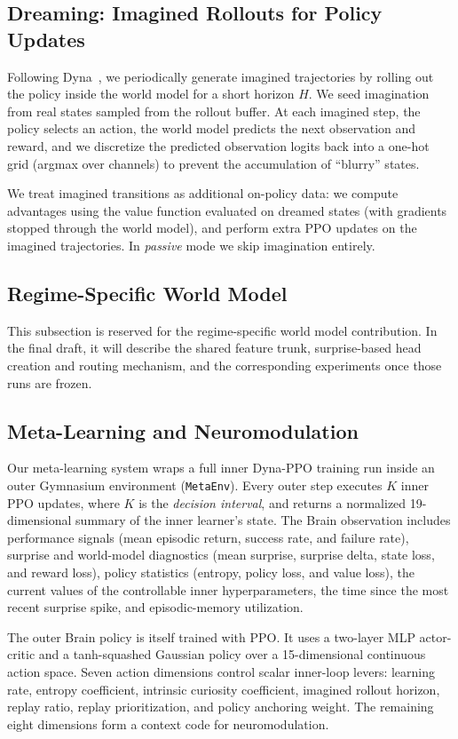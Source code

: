 ﻿\documentclass[sigconf]{acmart}
\begin{document}
\subsection{Dreaming: Imagined Rollouts for Policy Updates}
Following Dyna~\cite{sutton1990dyna}, we periodically generate imagined trajectories by rolling out the policy inside the world model for a short horizon $H$. We seed imagination from real states sampled from the rollout buffer. At each imagined step, the policy selects an action, the world model predicts the next observation and reward, and we discretize the predicted observation logits back into a one-hot grid (argmax over channels) to prevent the accumulation of ``blurry'' states.

We treat imagined transitions as additional on-policy data: we compute advantages using the value function evaluated on dreamed states (with gradients stopped through the world model), and perform extra PPO updates on the imagined trajectories. In \emph{passive} mode we skip imagination entirely.

\subsection{Regime-Specific World Model}
This subsection is reserved for the regime-specific world model contribution. In the final draft, it will describe the shared feature trunk, surprise-based head creation and routing mechanism, and the corresponding experiments once those runs are frozen.

\subsection{Meta-Learning and Neuromodulation}
Our meta-learning system wraps a full inner Dyna-PPO training run inside an outer Gymnasium environment (\texttt{MetaEnv}). Every outer step executes $K$ inner PPO updates, where $K$ is the \emph{decision interval}, and returns a normalized 19-dimensional summary of the inner learner's state. The Brain observation includes performance signals (mean episodic return, success rate, and failure rate), surprise and world-model diagnostics (mean surprise, surprise delta, state loss, and reward loss), policy statistics (entropy, policy loss, and value loss), the current values of the controllable inner hyperparameters, the time since the most recent surprise spike, and episodic-memory utilization.

The outer Brain policy is itself trained with PPO. It uses a two-layer MLP actor-critic and a tanh-squashed Gaussian policy over a 15-dimensional continuous action space. Seven action dimensions control scalar inner-loop levers: learning rate, entropy coefficient, intrinsic curiosity coefficient, imagined rollout horizon, replay ratio, replay prioritization, and policy anchoring weight. The remaining eight dimensions form a context code for neuromodulation.
\end{document}
